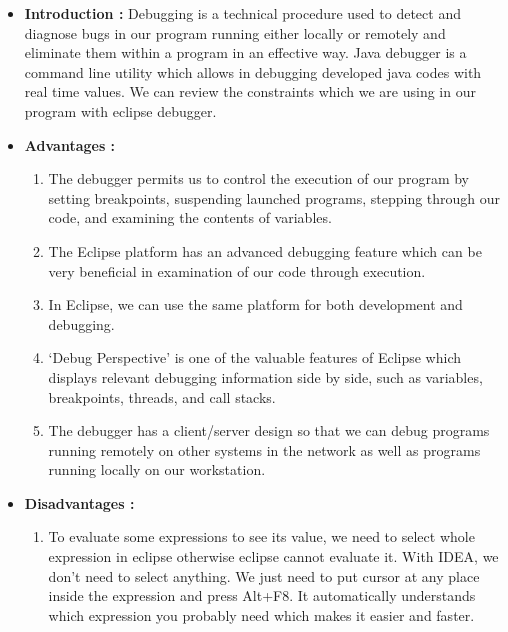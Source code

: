 \documentclass[a4paper,11pt]{report}
\begin{document}
\begin{itemize}
 \item\textbf{Introduction : }Debugging is a technical procedure used to detect and diagnose bugs in our program running either locally or remotely and eliminate them within a program in an effective way. Java debugger is a command line utility which allows in debugging developed java codes with real time values. We can review the constraints which we are using in our program with eclipse debugger.\\
 \item \textbf{Advantages : }
 \begin{enumerate}
     \item The debugger permits us to control the execution of our program by setting breakpoints, suspending launched programs, stepping through our code, and examining the contents of variables.\\
     \item The Eclipse platform has an advanced debugging feature which can be very beneficial in examination of our code through execution.\\
     \item In Eclipse, we can use the same platform for both development and debugging.\\
     \item ‘Debug Perspective’ is one of the valuable features of Eclipse which displays relevant debugging information side by side, such as variables, breakpoints, threads, and call stacks.\\
     \item The debugger has a client/server design so that we can debug programs running remotely on other systems in the network as well as programs running locally on our workstation.
     
 \end{enumerate}
 \item \textbf{Disadvantages : }
 \begin{enumerate}
     \item To evaluate some expressions to see its value, we need to select whole expression in eclipse otherwise eclipse cannot evaluate it. With IDEA, we don’t need to select anything. We just need to put cursor at any place inside the expression and press Alt+F8. It automatically understands which expression you probably need which makes it easier and faster.
 \end{enumerate}
 \end{itemize}
 
\end{document}
